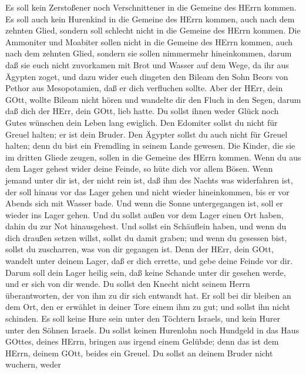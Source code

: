  Es soll kein Zerstoßener noch Verschnittener in die Gemeine
des HErrn kommen.  Es soll auch kein Hurenkind in die
Gemeine des HErrn kommen, auch nach dem zehnten Glied, sondern soll
schlecht nicht in die Gemeine des HErrn kommen.  Die
Ammoniter und Moabiter sollen nicht in die Gemeine des HErrn kommen,
auch nach dem zehnten Glied, sondern sie sollen nimmermehr hineinkommen,
 darum daß sie euch nicht zuvorkamen mit Brot und Wasser auf
dem Wege, da ihr aus Ägypten zoget, und dazu wider euch dingeten den
Bileam den Sohn Beors von Pethor aus Mesopotamien, daß er dich
verfluchen sollte.  Aber der HErr, dein GOtt, wollte Bileam
nicht hören und wandelte dir den Fluch in den Segen, darum daß dich der
HErr, dein GOtt, lieb hatte.  Du sollst ihnen weder Glück
noch Gutes wünschen dein Leben lang ewiglich.  Den Edomiter
sollst du nicht für Greuel halten; er ist dein Bruder. Den Ägypter
sollst du auch nicht für Greuel halten; denn du bist ein Fremdling in
seinem Lande gewesen.  Die Kinder, die sie im dritten Gliede
zeugen, sollen in die Gemeine des HErrn kommen.  Wenn du aus
dem Lager gehest wider deine Feinde, so hüte dich vor allem Bösen.
 Wenn jemand unter dir ist, der nicht rein ist, daß ihm des
Nachts was widerfahren ist, der soll hinaus vor das Lager gehen und
nicht wieder hineinkommen,  bis er vor Abends sich mit
Wasser bade. Und wenn die Sonne untergegangen ist, soll er wieder ins
Lager gehen.  Und du sollst außen vor dem Lager einen Ort
haben, dahin du zur Not hinausgehest.  Und sollst ein
Schäuflein haben, und wenn du dich draußen setzen willst, sollst du
damit graben; und wenn du gesessen bist, sollst du zuscharren, was von
dir gegangen ist.  Denn der HErr, dein GOtt, wandelt unter
deinem Lager, daß er dich errette, und gebe deine Feinde vor dir. Darum
soll dein Lager heilig sein, daß keine Schande unter dir gesehen werde,
und er sich von dir wende.  Du sollst den Knecht nicht
seinem Herrn überantworten, der von ihm zu dir sich entwandt hat.
 Er soll bei dir bleiben an dem Ort, den er erwählet in
deiner Tore einem ihm zu gut; und sollst ihn nicht schinden.
 Es soll keine Hure sein unter den Töchtern Israels, und
kein Hurer unter den Söhnen Israels.  Du sollst keinen
Hurenlohn noch Hundgeld in das Haus GOttes, deines HErrn, bringen aus
irgend einem Gelübde; denn das ist dem HErrn, deinem GOtt, beides ein
Greuel.  Du sollst an deinem Bruder nicht wuchern, weder
